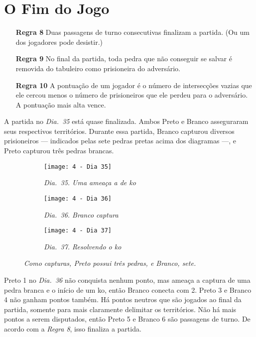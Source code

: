 \chapter{O Fim do Jogo}

\begin{itemize}
    \item[\textbf{Regra 8}] Duas passagens de turno consecutivas finalizam a partida. (Ou um dos jogadores pode desistir.)
    \item[\textbf{Regra 9}] No final da partida, toda pedra que não conseguir se salvar é removida do tabuleiro como prisioneira do adversário.
    \item[\textbf{Regra 10}] A pontuação de um jogador é o número de intersecções vazias que ele cercou menos o número de prisioneiros que ele perdeu para o adversário. A pontuação mais alta vence.
\end{itemize}

A partida no \emph{Dia.\@~35} está quase finalizada. Ambos Preto e Branco asseguraram seus respectivos territórios. Durante essa partida, Branco capturou diversos prisioneiros --- indicados pelas sete pedras pretas acima dos diagramas ---, e Preto capturou três pedras brancas.

\begin{figure}[h!]
    \centering
    \begin{subfigure}[t]{.3\textwidth}
        \centering
        \texttt{[image: 4 - Dia 35]}
        \caption*{\emph{Dia.\@~35. Uma ameaça a de ko}}
    \end{subfigure}
    \hfill
    \begin{subfigure}[t]{.3\textwidth}
        \centering
        \texttt{[image: 4 - Dia 36]}
        \caption*{\emph{Dia.\@~36. Branco captura}}
    \end{subfigure}
    \hfill
    \begin{subfigure}[t]{.3\textwidth}
        \centering
        \texttt{[image: 4 - Dia 37]}
        \caption*{\emph{Dia.\@~37. Resolvendo o ko}}
    \end{subfigure}
    \caption*{\emph{Como capturas, Preto possui três pedras, e Branco, sete.}}
\end{figure}
  
Preto 1 no \emph{Dia.\@~36} não conquista nenhum ponto, mas ameaça a captura de uma pedra branca e o início de um ko, então Branco conecta com 2. Preto 3 e Branco 4 não ganham pontos também. Há pontos neutros que são jogados ao final da partida, somente para mais claramente delimitar os territórios. Não há mais pontos a serem disputados, então Preto 5 e Branco 6 são passagens de turno. De acordo com a \emph{Regra 8}, isso finaliza a partida.

